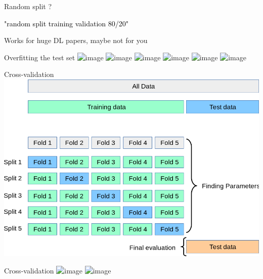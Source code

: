 \documentclass{irdbeamer}
\let\oldcite=\cite
\renewcommand{\cite}[1]{\textcolor[rgb]{.5,.5,.7}{\oldcite{#1}}}
\begin{document}
\begin{frame}{Random split ?}
    \begin{center}
    \textcolor{black}{"random split training validation 80/20"}
    \end{center}

    \pause
    
        \centering
        \vspace{-0.5cm}

            \cite{oquab2023dinov2}
    
    \pause
    Works for huge DL papers, maybe not for you
\end{frame}

\begin{frame}{Overfitting the test set}
    \centering
    \includegraphics<1>[width=.5\textwidth]{./figs/schemas/lucky_test.png}%
    \includegraphics<2>[width=.5\textwidth]{./figs/schemas/overfit_test1.png}%
    \includegraphics<3>[width=.5\textwidth]{./figs/schemas/overfit_test2.png}%
    \includegraphics<4>[width=.5\textwidth]{./figs/schemas/overfit_test3.png}%
    \includegraphics<5>[width=.5\textwidth]{./figs/schemas/overfit_test4.png}%
    \includegraphics<6>[width=.5\textwidth]{./figs/schemas/overfit_test5.png}%
\end{frame}

\begin{frame}{Cross-validation}
    \centering
    \includegraphics[width=.5\textwidth]{./figs/cross_validation.png}
\end{frame}

\begin{frame}{Cross-validation}
    \centering
    \includegraphics<1>[width=.7\textwidth]{./figs/kfold.png}%
    \includegraphics<2>[width=.7\textwidth]{./figs/stratified_kfold.png}%
\end{frame}
\end{document}
